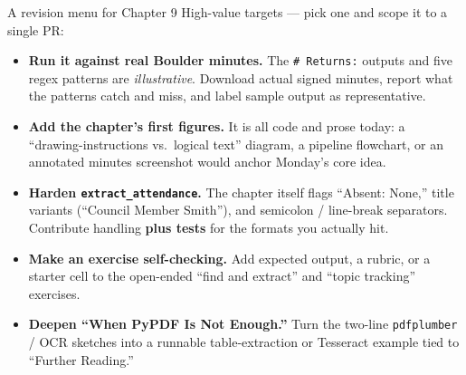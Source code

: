 \documentclass[9pt,aspectratio=169]{beamer}
\begin{document}
\begin{frame}{A revision menu for Chapter 9}
    High-value targets --- pick one and scope it to a single PR:
    \begin{itemize}
        \item \textbf{Run it against real Boulder minutes.} The \texttt{\# Returns:} outputs and five regex patterns are \textit{illustrative}. Download actual signed minutes, report what the patterns catch and miss, and label sample output as representative.
        \item \textbf{Add the chapter's first figures.} It is all code and prose today: a ``drawing-instructions vs.\ logical text'' diagram, a pipeline flowchart, or an annotated minutes screenshot would anchor Monday's core idea.
        \item \textbf{Harden \texttt{extract\_attendance}.} The chapter itself flags ``Absent: None,'' title variants (``Council Member Smith''), and semicolon / line-break separators. Contribute handling \textbf{plus tests} for the formats you actually hit.
        \item \textbf{Make an exercise self-checking.} Add expected output, a rubric, or a starter cell to the open-ended ``find and extract'' and ``topic tracking'' exercises.
        \item \textbf{Deepen ``When PyPDF Is Not Enough.''} Turn the two-line \texttt{pdfplumber} / OCR sketches into a runnable table-extraction or Tesseract example tied to ``Further Reading.''
    \end{itemize}
\end{frame}
\end{document}
